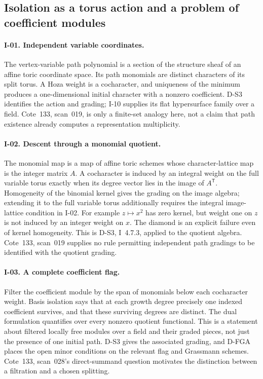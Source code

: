 \subsection{Isolation as a torus action and a problem of coefficient modules}

\paragraph{I-01. Independent variable coordinates.}
The vertex-variable path polynomial is a section of the structure sheaf of an affine toric coordinate space. Its path monomials are distinct characters of its split torus. A Hoza weight is a cocharacter, and uniqueness of the minimum produces a one-dimensional initial character with a nonzero coefficient. D-S3 identifies the action and grading; I-10 supplies its flat hypersurface family over a field. Cote~133, scan~019, is only a finite-set analogy here, not a claim that path existence already computes a representation multiplicity.

\paragraph{I-02. Descent through a monomial quotient.}
The monomial map is a map of affine toric schemes whose character-lattice map is the integer matrix $A$. A cocharacter is induced by an integral weight on the full variable torus exactly when its degree vector lies in the image of $A^{\mathsf T}$. Homogeneity of the binomial kernel gives the grading on the image algebra; extending it to the full variable torus additionally requires the integral image-lattice condition in I-02. For example $z\mapsto x^2$ has zero kernel, but weight one on $z$ is not induced by an integer weight on $x$. The diamond is an explicit failure even of kernel homogeneity. This is D-S3, I~4.7.3, applied to the quotient algebra. Cote~133, scan~019 supplies no rule permitting independent path gradings to be identified with the quotient grading.

\paragraph{I-03. A complete coefficient flag.}
Filter the coefficient module by the span of monomials below each cocharacter weight. Basis isolation says that at each growth degree precisely one indexed coefficient survives, and that these surviving degrees are distinct. The dual formulation quantifies over every nonzero quotient functional. This is a statement about filtered locally free modules over a field and their graded pieces, not just the presence of one initial path. D-S3 gives the associated grading, and D-FGA places the open minor conditions on the relevant flag and Grassmann schemes. Cote~133, scan~028's direct-summand question motivates the distinction between a filtration and a chosen splitting.

